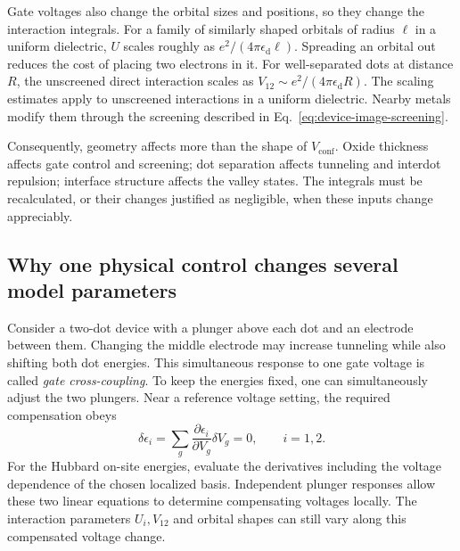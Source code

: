 Gate voltages also change the orbital sizes and positions,
so they change the interaction integrals.
For a family of similarly shaped orbitals of radius $\ell$
in a uniform dielectric,
$U$ scales roughly as $e^2/(4\pi\epsilon_{\mathrm d}\ell)$.
Spreading an orbital out reduces the cost of placing two
electrons in it. For well-separated dots at distance $R$,
the unscreened direct interaction scales as
$V_{12}\sim e^2/(4\pi\epsilon_{\mathrm d}R)$.
The scaling estimates apply to unscreened interactions in a
uniform dielectric. Nearby metals modify them through the
screening described in Eq.~\eqref{eq:device-image-screening}.

Consequently, geometry affects more than the shape of
$V_{\mathrm{conf}}$. Oxide thickness affects gate control and
screening; dot separation affects tunneling and interdot
repulsion; interface structure affects the valley states.
The integrals must be recalculated, or their changes justified
as negligible, when these inputs change appreciably.

\subsection{Why one physical control changes several model parameters}

Consider a two-dot device with a plunger above each dot and
an electrode between them. Changing the middle electrode may
increase tunneling while also shifting both dot energies.
This simultaneous response to one gate voltage is called
\emph{gate cross-coupling}.
To keep the energies fixed, one can simultaneously adjust the
two plungers. Near a reference voltage setting, the required
compensation obeys
\begin{equation}
 \delta\epsilon_i
    =\sum_g
       \frac{\partial\epsilon_i}{\partial V_g}\delta V_g=0,
 \qquad i=1,2.
 \label{eq:device-compensation}
\end{equation}
For the Hubbard on-site energies, evaluate the derivatives
including the voltage dependence of the chosen localized basis.
Independent plunger responses allow these two linear equations
to determine compensating voltages locally. The interaction
parameters $U_i,V_{12}$ and orbital shapes can still vary along
this compensated voltage change.

